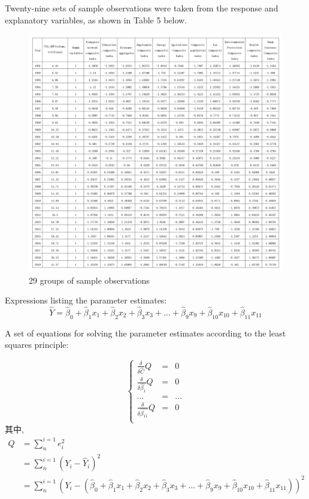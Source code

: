 \documentclass{apmcmthesis}
\begin{document}
Twenty-nine sets of sample observations were taken from the response and explanatory variables, as shown in Table 5 below.

\begin{figure}[H]
	\centering
	\includegraphics[width=\linewidth]{表5.jpeg}
	\caption{29 groups of sample observations}
\end{figure}

Expressions listing the parameter estimates:
\begin{equation}
\hat{Y} = \hat{\beta}_0 +\hat{\beta}_1x_1 +\hat{\beta}_2x_2 + \hat{\beta}_3x_3 +...+ \hat{\beta}_9x_9 +\hat{\beta}_{10}x_{10} +\hat{\beta}_{11}x_{11} 
\end{equation}

A set of equations for solving the parameter estimates according to the least squares principle:

\begin{equation}
	\left\{
	\begin{aligned}
		\frac{\delta}{\delta\hat{C}}Q & = & 0 \\
		\frac{\delta}{\delta\hat{\beta_1}}Q & = & 0 \\
		... & = & ...\\
		\frac{\delta}{\delta\hat{\beta_{11}}}Q & = & 0 \\
	\end{aligned}
	\right.
\end{equation}
其中,
\begin{equation}
\begin{aligned}
Q&=\sum_{n}^{i=1}e_i^2\\
&=\sum_{n}^{i=1}(Y_i-\hat{Y}_i)^2\\
&=\sum_{n}^{i=1}(Y_i-(\hat{\beta}_0 +\hat{\beta}_1x_1 +\hat{\beta}_2x_2 + \hat{\beta}_3x_3 +...+ \hat{\beta}_9x_9 +\hat{\beta}_{10}x_{10} +\hat{\beta}_{11}x_{11} ))^2
\end{aligned}
\end{equation}
\end{document}
